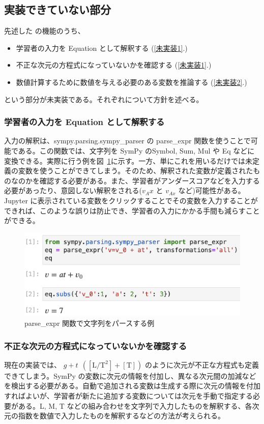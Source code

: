 \clearpage

\subsection{実装できていない部分}

先述した \simname の機能のうち、
\begin{itemize}
  \item 学習者の入力を Equation として解釈する (\ref{未実装1}.)
  \item 不正な次元の方程式になっていないかを確認する (\ref{未実装1}.)
  \item 数値計算するために数値を与える必要のある変数を推論する (\ref{未実装2}.)
\end{itemize}
という部分が未実装である。それぞれについて方針を述べる。

\subsubsection*{学習者の入力を Equation として解釈する}
入力の解釈は、sympy.parsing.sympy\_parser の parse\_expr 関数を使うことで可能である。この関数では、文字列を SymPy のSymbol, Sum, Mul や Eq などに変換できる。実際に行う例を図~\ref{example_parse}に示す。一方、単にこれを用いるだけでは未定義の変数を使うことができてしまう。そのため、解釈された変数が定義されたものなのかを確認する必要がある。また、学習者がアンダースコアなどを入力する必要があったり、意図しない解釈をされる($v_Ax$ と $v_{Ax}$ など)可能性がある。Jupyter に表示されている変数をクリックすることでその変数を入力することができれば、このような誤りは防止でき、学習者の入力にかかる手間も減らすことができる。

\begin{figure}[htb]
  \centering
  \includegraphics[width=0.9\linewidth]{work/example_parse.png}
  \caption{parse\_expr 関数で文字列をパースする例} \label{example_parse}
\end{figure}

\subsubsection*{不正な次元の方程式になっていないかを確認する}
現在の実装では、 $g + t~~\mathrm{([L/T^2] + [T])}$ のように次元が不正な方程式も定義できてしまう。SymPy の変数に次元の情報を付加し、異なる次元間の加減などを検出する必要がある。自動で追加される変数は生成する際に次元の情報を付加すればよいが、学習者が新たに追加する変数については次元を手動で指定する必要がある。L, M, T などの組み合わせを文字列で入力したものを解釈する、各次元の指数を数値で入力したものを解釈するなどの方法が考えられる。

